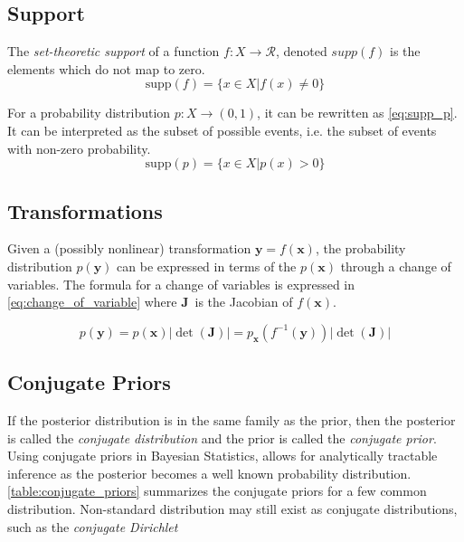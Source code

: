 \subsection{Support}
The \textit{set-theoretic support} of a function $f: X \to \mathcal{R}$, denoted $supp(f)$ is the elements which do not map to zero.
\begin{equation}
    \text{supp}(f) = \{x \in X | f(x) \neq 0\}
\end{equation}

For a probability distribution $p: X \to (0, 1)$, it can be rewritten as \cref{eq:supp_p}. It can be interpreted as the subset of possible events, i.e. the subset of events with non-zero probability. 
\begin{equation}\label{eq:supp_p}
    \text{supp}(p) = \{ x \in X | p(x) > 0 \}
\end{equation}

\subsection{Transformations}
Given a (possibly nonlinear) transformation $\mathbf{y} = f(\mathbf{x})$, the probability distribution $p(\mathbf{y})$ can be expressed in terms of the $p(\mathbf{x})$ through a change of variables. The formula for a change of variables is expressed in \cref{eq:change_of_variable} where $\boldsymbol{J}$ is the Jacobian of $f(\mathbf{x})$.

\begin{equation}\label{eq:change_of_variable}
    p(\mathbf{y}) = p(\mathbf{x}) | \det (\mathbf{J}) | = p_{\mathbf{x}}(f^{-1}(\mathbf{y})) | \det (\mathbf{J}) |  
\end{equation}

\subsection{Conjugate Priors}\label{sec:theory_conjugate_priors}
If the posterior distribution is in the same family as the prior, then the posterior is called the \textit{conjugate distribution} and the prior is called the \textit{conjugate prior}. Using conjugate priors in Bayesian Statistics, allows for analytically tractable inference as the posterior becomes a well known probability distribution. \cref{table:conjugate_priors} summarizes the conjugate priors for a few common distribution. Non-standard distribution may still exist as conjugate distributions, such as the \textit{conjugate Dirichlet}


